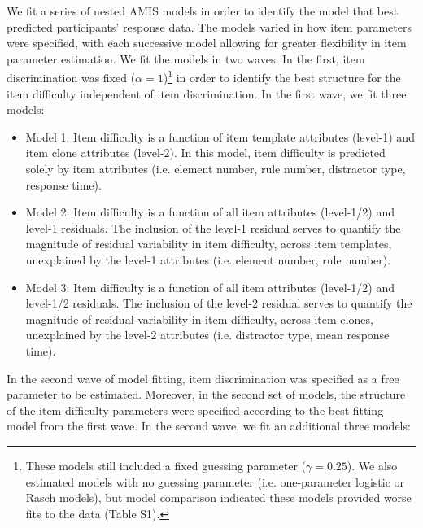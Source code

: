\documentclass[a4paper,man,natbib]{apa6}
\begin{document}
We fit a series of nested AMIS models in order to identify the model that best predicted participants' response data. The models varied in how item parameters were specified, with each successive model allowing for greater flexibility in item parameter estimation. We fit the models in two waves. In the first, item discrimination was fixed ($\alpha = 1$)\footnote{These models still included a fixed guessing parameter ($\gamma = 0.25$). We also estimated models with no guessing parameter (i.e. one-parameter logistic or Rasch models), but model comparison indicated these models provided worse fits to the data (Table S1).} in order to identify the best structure for the item difficulty independent of item discrimination. In the first wave, we fit three models:

\begin{itemize}

    \item Model 1: Item difficulty is a function of item template attributes (level-1) and item clone attributes (level-2). In this model, item difficulty is predicted solely by item attributes (i.e. element number, rule number, distractor type, response time). 

    \item Model 2: Item difficulty is a function of all item attributes (level-1/2) and level-1 residuals. The inclusion of the level-1 residual serves to quantify the magnitude of residual variability in item difficulty, across item templates, unexplained by the level-1 attributes (i.e. element number, rule number).

    \item Model 3: Item difficulty is a function of all item attributes (level-1/2) and level-1/2 residuals. The inclusion of the level-2 residual serves to quantify the magnitude of residual variability in item difficulty, across item clones, unexplained by the level-2 attributes (i.e. distractor type, mean response time).

\end{itemize}

In the second wave of model fitting, item discrimination was specified as a free parameter to be estimated. Moreover, in the second set of models, the structure of the item difficulty parameters were specified according to the best-fitting model from the first wave. In the second wave, we fit an additional three models:
\end{document}

